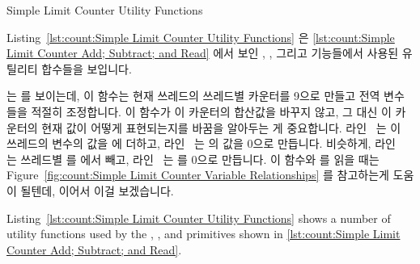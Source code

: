\begin{listing}[tbp]

\caption{Simple Limit Counter Utility Functions}
\label{lst:count:Simple Limit Counter Utility Functions}
\end{listing}

Listing~\ref{lst:count:Simple Limit Counter Utility Functions}
은
\cref{lst:count:Simple Limit Counter Add; Subtract; and Read}
에서 보인 , , 그리고 
기능들에서 사용된 유틸리티 합수들을 보입니다.

\begin{fcvref}
 는  를 보이는데, 이 함수는 현재
쓰레드의 쓰레드별 카운터를 9으로 만들고 전역 변수들을 적절히 조정합니다.
이 함수가 이 카운터의 합산값을 바꾸지 않고, 그 대신 이 카운터의 현재 값이
어떻게 표현되는지를 바꿈을 알아두는 게 중요합니다.
라인~ 는 이 쓰레드의  변수의 값을  에
더하고, 라인~ 는  의 값을 0으로 만듭니다.
비슷하게, 라인~ 는 쓰레드별  를 
에서 빼고, 라인~ 는  를 0으로 만듭니다.
이 함수와  를 읽을 때는
Figure~\ref{fig:count:Simple Limit Counter Variable Relationships}
를 참고하는게 도움이 될텐데, 이어서 이걸 보겠습니다.
\end{fcvref}

\iffalse

Listing~\ref{lst:count:Simple Limit Counter Utility Functions}
shows a number of utility functions used by the ,
, and  primitives shown in
\cref{lst:count:Simple Limit Counter Add; Subtract; and Read}.

